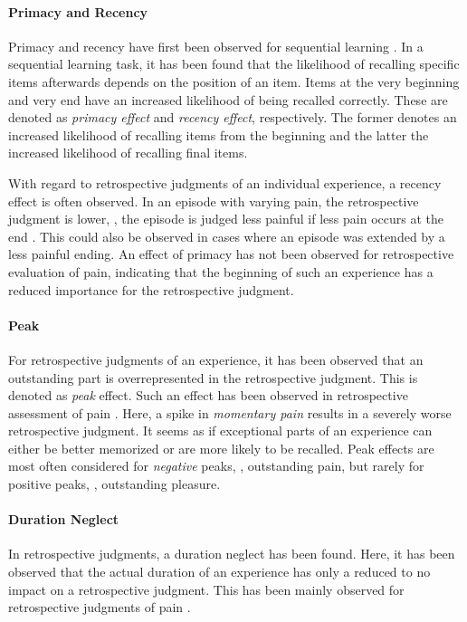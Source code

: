 \paragraph*{Primacy and Recency}
Primacy and recency have first been observed for sequential learning \citep[][]{murdock_jr._serial_1962}.
In a sequential learning task, it has been found that the likelihood of recalling specific items afterwards depends on the position of an item.
Items at the very beginning and very end have an increased likelihood of being recalled correctly.
These are denoted as \emph{primacy effect} and \emph{recency effect}, respectively.
The former denotes an increased likelihood of recalling items from the beginning and the latter the increased likelihood of recalling final items.

With regard to retrospective judgments of an individual experience, a recency effect is often observed.
In an episode with varying pain, the retrospective judgment is lower, \ie, the episode is judged less painful if less pain occurs at the end \citep[][]{kahneman_when_1993, redelmeier_patients_1996}.
This could also be observed in cases where an episode was extended by a less painful ending.
An effect of primacy has not been observed for retrospective evaluation of pain, indicating that the beginning of such an experience has a reduced importance for the retrospective judgment.

\paragraph*{Peak}
For retrospective judgments of an experience, it has been observed that an outstanding part is overrepresented in the retrospective judgment.
This is denoted as \emph{peak} effect.
Such an effect has been observed in retrospective assessment of pain \citep[][]{kahneman_when_1993, redelmeier_patients_1996}.
Here, a spike in \emph{momentary pain} results in a severely worse retrospective judgment.
It seems as if exceptional parts of an experience can either be better memorized or are more likely to be recalled.
Peak effects are most often considered for \emph{negative} peaks, \eg, outstanding pain, but rarely for positive peaks, \eg, outstanding pleasure.

\paragraph*{Duration Neglect}
In retrospective judgments, a duration neglect has been found.
Here, it has been observed that the actual duration of an experience has only a reduced to no impact on a retrospective judgment.
This has been mainly observed for retrospective judgments of pain \citep[][]{fredrickson_duration_1993, ariely_combining_1998}.

